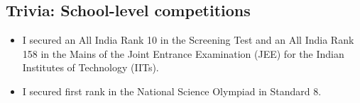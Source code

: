 \documentclass[a4paper]{amsart}
\begin{document}
\subsection{Trivia: School-level competitions}

\begin{itemize}

\item I secured an All India Rank 10 in the Screening Test and 
  an All India Rank 158 in the Mains of the Joint Entrance
  Examination (JEE) for the Indian Institutes of Technology (IITs).

\item I secured first rank in the National Science Olympiad in Standard
  8.

\end{itemize}
\end{document}
